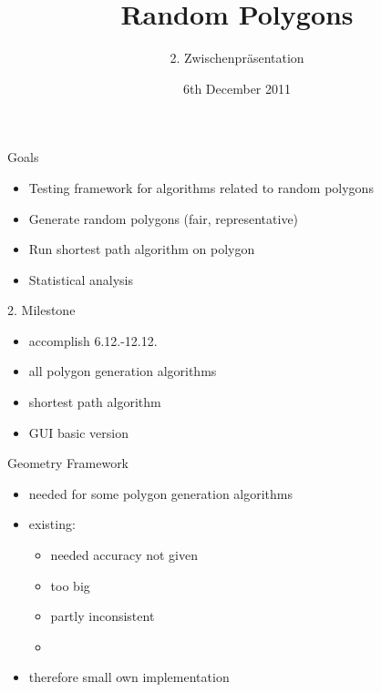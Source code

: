 \documentclass[ucs,10pt]{beamer}
\title[Random Polygons]{Random Polygons}
\subtitle{2. Zwischenpräsentation}
\institute[FU Berlin]{Freie Universität Berlin}
\date[06.12.2011]{6th December 2011}
\begin{document}
\begin{frame}[plain]
  \titlepage
\end{frame}


\begin{frame}{Goals}
	\begin{itemize}
	\item Testing framework for algorithms related to random polygons
	\item Generate random polygons (fair, representative)
	\item Run shortest path algorithm on polygon
	\item Statistical analysis
	\end{itemize}
\end{frame}

\begin{frame}{2. Milestone}
  \begin{itemize}
  \item accomplish 6.12.-12.12.
  \item all polygon generation algorithms
  \item shortest path algorithm
  \item GUI basic version
  \end{itemize}
\end{frame}

\begin{frame}{Geometry Framework}
  \begin{itemize}
    \item needed for some polygon generation algorithms
    \item existing:
    \begin{itemize}
      \item needed accuracy not given
      \item too big 
      \item partly inconsistent
      \item 
    \end{itemize}
    \item therefore small own implementation
  \end{itemize}
\end{frame}
\end{document}
